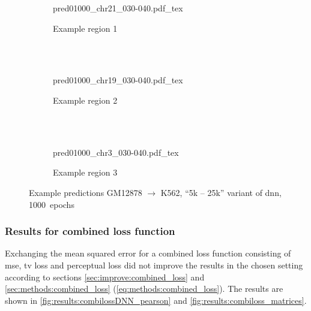 \begin{figure}[p]
    \begin{subfigure}{\textwidth}
        \centering
        \scriptsize
        {pred01000_chr21_030-040.pdf_tex}
        \caption{Example  region 1} \label{fig:results:25k5_r1}
    \end{subfigure}\\[2mm]
    \\[3mm]
    \begin{subfigure}{\textwidth}
        \centering
        \scriptsize
        {pred01000_chr19_030-040.pdf_tex}
        \caption{Example region 2} \label{fig:results:25k5_r2}
    \end{subfigure}\\[2mm]
    \\[3mm]
    \begin{subfigure}{\textwidth}
        \centering
        \scriptsize
        {pred01000_chr3_030-040.pdf_tex}
        \caption{Example region 3} \label{fig:results:25k5_r3}
    \end{subfigure}
    \caption{Example predictions GM12878 $\rightarrow$ K562, ``5k -- 25k'' variant of \acrshort{dnn}, 1000~epochs} \label{fig:results:25k5_matrices}
\end{figure}
\clearpage

\subsubsection{Results for combined loss function} \label{sec:results:loss_functions}
Exchanging the mean squared error for a combined loss function consisting of \acrshort{mse}, \acrshort{tv} loss and perceptual loss did not improve the results in the chosen setting
according to sections \ref{sec:improve:combined_loss} and \ref{sec:methods:combined_loss} (\cref{eq:methods:combined_loss}).
The results are shown in \cref{fig:results:combilossDNN_pearson} and \ref{fig:results:combiloss_matrices}.

